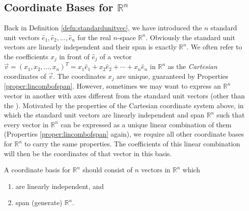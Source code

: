 \subsection{Coordinate Bases for $\mathbb{R}^n$}
\label{section:6.1.5}
Back in Definition \ref{defn:standardunitvec}, we have introduced the $n$ standard unit vectors $\hat{e}_1, \hat{e}_2, \ldots, \hat{e}_n$ for the real $n$-space $\mathbb{R}^n$. Obviously the standard unit vectors are linearly independent and their span is exactly $\mathbb{R}^n$. We often refer to the coefficients $x_j$ in front of $\hat{e}_j$ of a vector $\vec{v} = (x_1, x_2, \ldots, x_n)^T = x_1\hat{e}_1 + x_2\hat{e}_2 + \cdots + x_n\hat{e}_n$ in $\mathbb{R}^n$ as the \textit{Cartesian} coordinates of $\vec{v}$. The coordinates $x_j$ are unique, guaranteed by Properties \ref{proper:lincombofspan}. However, sometimes we may want to express an $\mathbb{R}^n$ vector in another  with axes different from the standard unit vectors (other than the ). Motivated by the properties of the Cartesian coordinate system above, in which the standard unit vectors are linearly independent and span $\mathbb{R}^n$ such that every vector in $\mathbb{R}^n$ can be expressed as a unique linear combination of them (Properties \ref{proper:lincombofspan} again), we require all other coordinate bases for $\mathbb{R}^n$ to carry the same properties. The coefficients of this linear combination will then be the coordinates of that vector in this basis.
\begin{defn}
\label{defn:coordRn}
A coordinate basis for $\mathbb{R}^n$ should consist of $n$ vectors in $\mathbb{R}^n$ which
\begin{enumerate}[label=(\alph*)]
\item are linearly independent, and
\item span (generate) $\mathbb{R}^n$.
\end{enumerate}
\end{defn}
